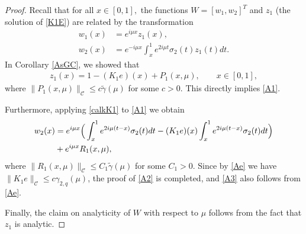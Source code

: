 \documentclass[11pt]{amsart}
\theoremstyle{plain}
\theoremstyle{definition}
\theoremstyle{remark}
\numberwithin{equation}{section}
\begin{document}
\begin{proof}
Recall that for all $x \in [0,1],$ the functions $W=[w_1, w_2]^T$ and $z_1$ (the solution of \eqref{K1E}) are related by the transformation
\begin{align*}
w_1(x)&=e^{i \mu x}z_1(x),\\
w_2(x)&=e^{-i \mu x}\int_x^1 e^{2i \mu t}\sigma_2(t)z_1(t)dt.
\end{align*}
In Corollary \ref{AsGC}, we showed that
\begin{align}
z_1(x)=1-(K_1e)(x)+P_1(x,\mu), \qquad x \in [0,1],
\end{align}
where $\|P_1(x,\mu)\|_\mathcal{C}\leq c \widetilde{\gamma}(\mu)$
for some $c>0$.
This directly implies  \eqref{A1}.

Furthermore, applying  \eqref{calkK1} to \eqref{A1} we obtain
\begin{align}\label{A11}
w_2(x)&=e^{i \mu x}\Big(\int_x^1 e^{2i \mu (t-x)}\sigma_2(t)dt-(K_1e)(x)\int_x^1e^{2i \mu (t-x)}\sigma_2(t)dt \Big)\\
&+ e^{i \mu x}R_1(x,\mu),\notag
\end{align}
where $\|R_1(x,\mu)\|_{\mathcal C} \leq C_1 \widetilde{\gamma}(\mu)$ for some $C_1>0$.
Since by \eqref{Ae} we have
$\|K_1e\|_{\mathcal C} \leq c \gamma_{2,q}(\mu)$, the proof of \eqref{A2} is completed,
and \eqref{A3} also follows from
\eqref{Ae}.

Finally, the claim on analyticity of $W$ with respect to $\mu$ follows
from the fact that $z_1$ is analytic.
\end{proof}
\end{document}

